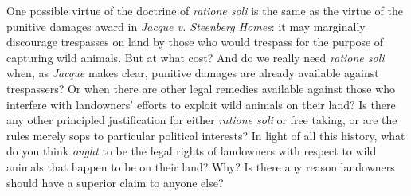One possible virtue of the doctrine of \textit{ratione soli} is the same as the
virtue of the punitive damages award in \textit{Jacque v. Steenberg Homes}: it
may marginally discourage trespasses on land by those who would trespass for the
purpose of capturing wild animals. But at what cost? And do we really need
\textit{ratione soli} when, as \textit{Jacque} makes clear, punitive damages are
already available against trespassers? Or when
there are other legal remedies available against those who interfere with
landowners' efforts to exploit wild animals on their land? Is there any other
principled justification for either \textit{ratione soli} or free taking, or are
the rules merely sops to particular political interests? In light of all this
history, what do you think \textit{ought} to be the legal rights of landowners
with respect to wild animals that happen to be on their land? Why? Is there any
reason landowners should have a superior claim to anyone else?

